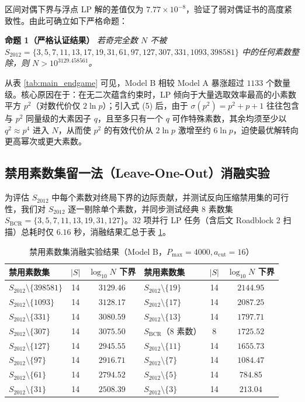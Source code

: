 \documentclass[11pt, a4paper]{article}
\begin{document}
区间对偶下界与浮点 LP 解的差值仅为 $7.77 \times 10^{-8}$，验证了弱对偶证书的高度紧致性。由此可确立如下严格命题：

\medskip
\noindent\textbf{命题 1（严格认证结果）} \textit{若奇完全数 $N$ 不被 $S_{2012} = \{3, 5, 7, 11, 13, 17, 19, 31, 61, 97, 127, 307, 331, 1093, 398581\}$ 中的任何素数整除，则 $N > 10^{3129.458561}$。}
\medskip

从表 \ref{tab:main_endgame} 可见，Model B 相较 Model A 暴涨超过 $1133$ 个数量级。核心原因在于：在无二次蕴含约束时，LP 倾向于大量选取效率最高的小素数平方 $p^2$（对数代价仅 $2\ln p$）；引入式 (5) 后，由于 $\sigma(p^2) = p^2 + p + 1$ 往往包含与 $p^2$ 同量级的大素因子 $q$，且至多只有一个 $q$ 可作特殊素数，其余均须至少以 $q^2 \approx p^4$ 进入 $N$，从而使 $p^2$ 的有效代价从 $2\ln p$ 激增至约 $6\ln p$，迫使最优解转向更高幂次或更大素数。

\subsection{禁用素数集留一法（Leave-One-Out）消融实验}

为评估 $S_{2012}$ 中每个素数对终局下界的边际贡献，并测试反向压缩禁用集的可行性，我们对 $S_{2012}$ 逐一剔除单个素数，并同步测试经典 8 素数集 $S_{\mathrm{BCR}} = \{3, 5, 7, 11, 13, 19, 31, 127\}$。32 项并行 LP 任务（含后文 Roadblock 2 扫描）总耗时仅 $6.16$ 秒，消融结果汇总于表 \ref{tab:ablation}。

\begin{table}[htbp]
\centering
\caption{禁用素数集消融实验结果（Model B，$P_{\max}=4000, a_{\mathrm{cut}}=16$）}
\label{tab:ablation}
\begin{tabular}{@{}lcc|lcc@{}}
\toprule
禁用素数集 & $|S|$ & $\log_{10} N$ 下界 & 禁用素数集 & $|S|$ & $\log_{10} N$ 下界 \\
\midrule
$S_{2012} \setminus \{398581\}$ & 14 & $3129.46$ & $S_{2012} \setminus \{19\}$ & 14 & $2144.95$ \\
$S_{2012} \setminus \{1093\}$ & 14 & $3128.17$ & $S_{2012} \setminus \{17\}$ & 14 & $2087.25$ \\
$S_{2012} \setminus \{331\}$ & 14 & $3080.59$ & $S_{2012} \setminus \{13\}$ & 14 & $1797.71$ \\
$S_{2012} \setminus \{307\}$ & 14 & $3075.50$ & $S_{\mathrm{BCR}}$（8 素数） & 8 & $1725.52$ \\
$S_{2012} \setminus \{127\}$ & 14 & $2945.55$ & $S_{2012} \setminus \{11\}$ & 14 & $1655.73$ \\
$S_{2012} \setminus \{97\}$ & 14 & $2916.71$ & $S_{2012} \setminus \{7\}$ & 14 & $1084.47$ \\
$S_{2012} \setminus \{61\}$ & 14 & $2794.52$ & $S_{2012} \setminus \{5\}$ & 14 & $784.85$ \\
$S_{2012} \setminus \{31\}$ & 14 & $2508.39$ & $S_{2012} \setminus \{3\}$ & 14 & $213.04$ \\
\bottomrule
\end{tabular}
\end{table}
\end{document}
